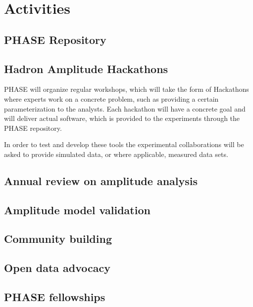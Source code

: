 \section{Activities}

\subsection{PHASE Repository}

\subsection{Hadron Amplitude Hackathons}
PHASE will organize regular workshops, which will take the form of Hackathons where experts work on a concrete problem, such as providing a certain parameterization to the analysts. Each hackathon will have a concrete goal and will deliver actual software, which is provided to the experiments through the PHASE repository.

In order to test and develop these tools the experimental collaborations will be asked to provide simulated data, or where applicable, measured data sets. 

\subsection{Annual review on amplitude analysis}

\subsection{Amplitude model validation}

\subsection{Community building}

\subsection{Open data advocacy}

\subsection{PHASE fellowships}